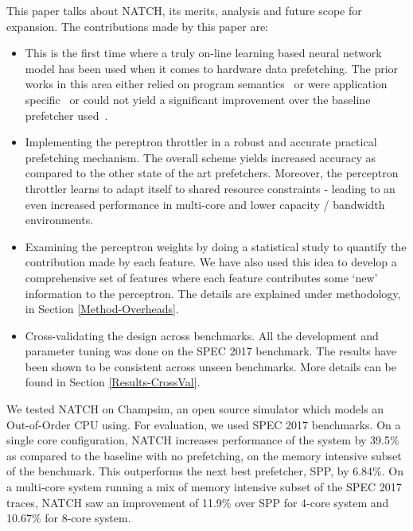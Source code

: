 \vspace{1ex}This paper talks about NATCH, its merits, analysis and
future scope for expansion.  The contributions made by this paper are:

\begin{itemize}
\item This is the first time where a truly on-line learning based
  neural network model has been used when it comes to hardware data
  prefetching.  The prior works in this area either relied on program
  semantics~\cite{Semantics} or were application
  specific~\cite{Datacenter} or could not yield a significant
  improvement over the baseline prefetcher used~\cite{BadPerc}.

\item Implementing the pereptron throttler in a robust and accurate
  practical prefetching mechanism.  The overall scheme yields
  increased accuracy as compared to the other state of the art
  prefetchers.  Moreover, the perceptron throttler learns to adapt
  itself to shared resource constraints - leading to an even increased
  performance in multi-core and lower capacity / bandwidth
  environments.

\item Examining the perceptron weights by doing a statistical study to
  quantify the contribution made by each feature.  We have also used
  this idea to develop a comprehensive set of features where each
  feature contributes some `new' information to the perceptron.  The
  details are explained under methodology, in Section \ref{Method-Overheads}.

\item Cross-validating the design across benchmarks.  All the
  development and parameter tuning was done on the SPEC 2017
  benchmark.  The results have been shown to be consistent across
  unseen benchmarks.  More details can be found in Section \ref{Results-CrossVal}.

\end{itemize}

We tested NATCH on Champsim, an open source simulator which models
an Out-of-Order CPU using.  For evaluation, we used SPEC 2017
benchmarks.  On a single core configuration, NATCH increases
performance of the system by 39.5\% as compared to the baseline with
no prefetching, on the memory intensive subset of the benchmark.  This
outperforms the next best prefetcher, SPP, by 6.84\%.  On a multi-core
system running a mix of memory intensive subset of the SPEC 2017
traces, NATCH saw an improvement of 11.9\% over SPP for 4-core
system and 10.67\% for 8-core system.

